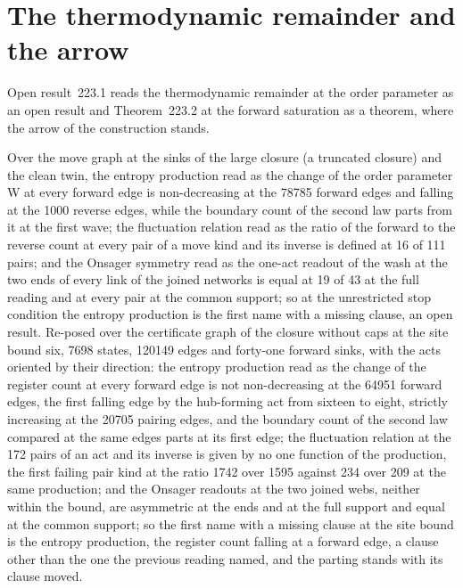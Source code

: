 \section{The thermodynamic remainder and the arrow}\label{mod:XI-7-thermodynamic-remainder-and-the-arrow}
\label{narr:open:11-7}Open result~223.1 reads the thermodynamic remainder at the order parameter as an open result and Theorem~223.2 at the forward saturation as a theorem, where the arrow of the construction stands.
\begin{chwall}\label{box:XI-7-thermodynamic-remainder-and-the-arrow:1}
Over the move graph at the sinks of the large closure (a truncated closure) and the clean twin, the entropy production read as the change of the order parameter W at every forward edge is non-decreasing at the 78785 forward edges and falling at the 1000 reverse edges, while the boundary count of the second law parts from it at the first wave; the fluctuation relation read as the ratio of the forward to the reverse count at every pair of a move kind and its inverse is defined at 16 of 111 pairs; and the Onsager symmetry read as the one-act readout of the wash at the two ends of every link of the joined networks is equal at 19 of 43 at the full reading and at every pair at the common support; so at the unrestricted stop condition the entropy production is the first name with a missing clause, an open result.
Re-posed over the certificate graph of the closure without caps at the site bound six, 7698 states, 120149 edges and forty-one forward sinks, with the acts oriented by their direction: the entropy production read as the change of the register count at every forward edge is not non-decreasing at the 64951 forward edges, the first falling edge by the hub-forming act from sixteen to eight, strictly increasing at the 20705 pairing edges, and the boundary count of the second law compared at the same edges parts at its first edge; the fluctuation relation at the 172 pairs of an act and its inverse is given by no one function of the production, the first failing pair kind at the ratio 1742 over 1595 against 234 over 209 at the same production; and the Onsager readouts at the two joined webs, neither within the bound, are asymmetric at the ends and at the full support and equal at the common support; so the first name with a missing clause at the site bound is the entropy production, the register count falling at a forward edge, a clause other than the one the previous reading named, and the parting stands with its clause moved.
\end{chwall}
